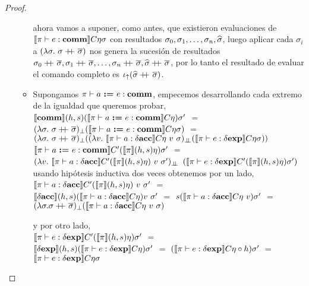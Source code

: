 \begin{proof}
\begin{itemize}
\begin{itemize}
ahora vamos a suponer, como antes, que existieron evaluaciones de 
$\llbracket \pi \vdash e : \textbf{comm} \rrbracket C \eta \sigma$
con resultados $\sigma_0, \sigma_1, \ldots, \sigma_n, \widehat{\sigma}$, luego
aplicar cada $\sigma_i$ a $(\lambda \sigma . \ \sigma +\kern-1.3ex+\kern0.8ex \overline{\sigma})$ nos
genera la sucesi\'on de resultados 
$\sigma_0\concat\sigmaover, \sigma_1\concat\sigmaover, \ldots, 
\sigma_n\concat\sigmaover, \sigmahat\concat\sigmaover$, por lo tanto el resultado
de evaluar el comando completo es $\iota_{\uparrow} (\widehat{\sigma}+\kern-1.3ex+\kern0.8ex\overline{\sigma})$.

\item Supongamos $\pi \vdash a \ \textbf{:=} \ e : \textbf{comm}$, empecemos desarrollando cada
extremo de la igualdad que queremos probar,\\

$\llbracket \textbf{comm} \rrbracket(h,s)(\llbracket \pi \vdash a \ \textbf{:=} \ e : \textbf{comm} \rrbracket C\eta)\sigma'$ $=$\\
$(\lambda \sigma. \ \sigma +\kern-1.3ex+\kern0.8ex \overline{\sigma})_{\bot}
				(\llbracket \pi \vdash a \ \textbf{:=} \ e : \textbf{comm} \rrbracket C\eta\sigma)$ $=$\\
$(\lambda \sigma. \ \sigma \concat \sigmaover)_{\bot}(
	(\lambda v. \ \semBrcks{\pi \vdash a : \deltaacc}C\eta \ v \ \sigma)_{\dbot}
	(\semBrcks{\pi \vdash e : \deltaexp}C\eta\sigma))$\\
	
$\llbracket \pi \vdash a \ \textbf{:=} \ e : \textbf{comm} \rrbracket C'(\llbracket \pi \rrbracket(h,s)\eta)\sigma'$ $=$\\
$(\lambda v. \ 
	\semBrcks{\pi \vdash a : \deltaacc}C'(\semBrcks{\pi}(h,s)\eta)\ v \ \sigma')_{\dbot}$
$(\llbracket \pi \vdash e : \delta \textbf{exp} \rrbracket C'(\llbracket \pi \rrbracket(h,s)\eta)\sigma')$ \\

usando hip\'otesis inductiva dos veces obtenemos por un lado,\\

$\llbracket \pi \vdash a : \delta \textbf{acc} \rrbracket C'(\llbracket \pi \rrbracket(h,s)\eta)\ v \ \sigma'$ $=$\\
$\llbracket \delta \textbf{acc} \rrbracket(h,s)(\llbracket \pi \vdash a : \delta \textbf{acc} \rrbracket C\eta) v \ \sigma'$ $=$
$s(\llbracket \pi \vdash a : \delta \textbf{acc} \rrbracket C \eta \ v)\sigma'$ $=$\\
$(\lambda \sigma . \sigma \concat \sigmaover)_{\bot}
				(\semBrcks{\pi \vdash a : \deltaacc} C \eta \ v \ \sigma)$
				
y por otro lado,\\

$\llbracket \pi \vdash e : \delta \textbf{exp} \rrbracket C'(\llbracket \pi \rrbracket(h,s)\eta)\sigma'$ $=$\\
$\llbracket \delta \textbf{exp} \rrbracket(h,s)(\llbracket \pi \vdash e : \delta \textbf{exp} \rrbracket C \eta)\sigma'$ $=$
$(\llbracket \pi \vdash e : \delta \textbf{exp} \rrbracket C \eta \circ h)\sigma'$ $=$\\
$\llbracket \pi \vdash e : \delta \textbf{exp} \rrbracket C \eta \sigma$\\


\end{itemize}
\end{itemize}
\end{proof}
